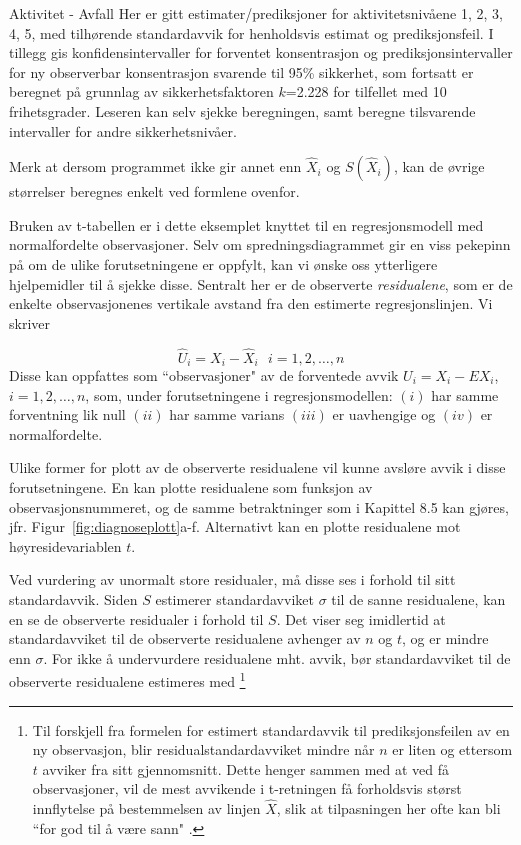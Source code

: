 \begin{eksempel}{Aktivitet - Avfall}
\noindent Her er gitt estimater/prediksjoner for aktivitetsnivåene 
1, 2, 3, 4, 5, med tilhørende standardavvik for henholdsvis estimat og
prediksjonsfeil. I tillegg gis konfidensintervaller for forventet
konsentrasjon og prediksjonsintervaller for ny observerbar konsentrasjon 
svarende til 95\% sikkerhet, som fortsatt er beregnet på grunnlag av
sikkerhetsfaktoren $k$=2.228 for tilfellet med 10 frihetsgrader. 
Leseren kan selv sjekke beregningen, samt beregne tilsvarende
intervaller for andre sikkerhetsnivåer.

Merk at dersom programmet ikke gir
annet enn $\hat X_i$ og $S(\hat X_i)$, kan de øvrige
størrelser beregnes enkelt ved formlene ovenfor.
\end{eksempel}

Bruken av t-tabellen er i dette eksemplet knyttet til en
regresjonsmodell med normalfordelte observasjoner. Selv om
spredningsdiagrammet gir en viss pekepinn på om de ulike
forutsetningene er oppfylt, kan vi ønske oss ytterligere
hjelpemidler til å sjekke disse. Sentralt her er de
observerte {\em residualene}, som er de enkelte observasjonenes vertikale avstand
fra den estimerte regresjonslinjen. Vi skriver

\[   \hat U_i=X_i - \hat X_i \mbox{\ \ \ } i=1,2,\ldots ,n\]
Disse kan oppfattes som ``observasjoner" av de forventede avvik
$U_i=X_i - EX_i$, $i=1,2,\ldots ,n$, som, under forutsetningene i
regresjonsmodellen: $(i)$ har samme forventning lik null $(ii)$
har samme varians $(iii)$ er uavhengige  og $(iv)$ er
normalfordelte.

Ulike former for plott av de observerte
residualene vil kunne avsløre avvik i disse forutsetningene.
En kan plotte residualene som funksjon av observasjonsnummeret,
og de samme betraktninger som i Kapittel 8.5 kan gjøres, jfr.
Figur~\ref{fig:diagnoseplott}a-f. Alternativt kan en plotte residualene mot
høyresidevariablen $t$.

Ved vurdering av unormalt store
residualer, må disse ses i forhold til sitt standardavvik.
Siden $S$ estimerer standardavviket $\sigma$ til de sanne
resi\-dualene, kan en se de observerte residualer i forhold til
$S$. Det viser seg imidlertid at standardavviket til de
observerte residualene avhenger av $n$ og $t$, og er mindre enn
$\sigma$. For ikke å undervurdere residualene mht. avvik, bør
standardavviket til de observerte residualene estimeres med
\footnote{Til forskjell fra formelen for estimert standardavvik til
prediksjonsfeilen av en ny observasjon, blir residualstandardavviket
mindre når $n$ er liten og ettersom $t$ avviker
fra sitt gjennomsnitt. Dette henger sammen med at ved få observasjoner,
vil de mest avvikende i t-retningen få forholdsvis
størst innflytelse på bestemmelsen av linjen $\hat X$,
slik at tilpasningen her ofte kan bli ``for god til å være sann" .} 

